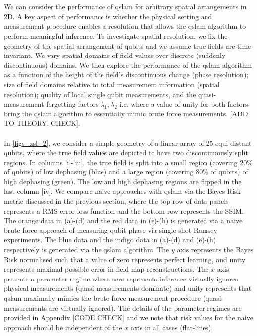 \\
\\
We can consider the performance of qslam for arbitrary spatial arrangements in 2D. A key aspect of performance is whether the physical setting and measurement procedure enables a resolution that allows the qslam algorithm to perform meaningful inference. To investigate spatial resolution, we fix the geometry of the spatial arrangement of qubits and we assume true fields are time-invariant. We vary spatial domains of field values over discrete (suddenly discontinuous) domains. We then explore the performance of the qslam algorithm as a function of the height of the field's discontinuous change (phase resolution); size of field domains relative to total measurement information  (spatial resolution); quality of local single qubit measurements, and the quasi-measurement forgetting factors $\lambda_1, \lambda_2$ i.e. where a value of unity for both factors bring the qslam algorithm to essentially mimic brute force measurements. [ADD TO THEORY, CHECK]. \\
\\
In \cref{figs_zsl_2}, we consider a simple geometry of a linear array of 25 equi-distant qubits, where the true field values are depicted to have two discontinuously split regions. In columns [i]-[iii], the true field is split into a small region (covering 20\% of qubits) of low dephasing (blue) and a large region (covering 80\% of qubits) of high dephasing (green). The low and high dephasing regions are flipped in the last column [iv]. We compare naive approaches with qslam via the Bayes Risk metric discussed in the previous section, where the top row of data panels represents a RMS error loss function and the bottom row represents the SSIM. The orange data in (a)-(d) and the red data in (e)-(h) is generated via a naive brute force approach of measuring qubit phase via single shot Ramsey experiments. The blue data and the indigo data in (a)-(d) and (e)-(h) respectively is generated via the qslam algorithm. The $y$ axis represents the Bayes Risk normalised such that a value of zero represents perfect learning, and unity represents maximal possible error in field map reconstructions. The $x$ axis presents a parameter regime where zero represents inference virtually ignores physical measurements (quasi-measurements dominate) and unity represents  that qslam maximally mimics the brute force measurement procedure (quasi-measurements are virtually ignored). The details of the parameter regimes are provided in Appendix [CODE CHECK] and we note that risk values for the naive approach should be independent of the $x$ axis in all cases (flat-lines).  \\
